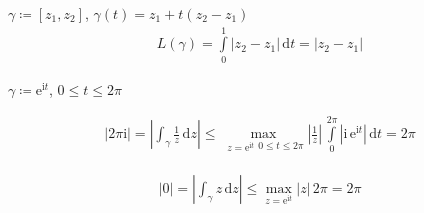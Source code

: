 \documentclass[a4paper,10pt]{scrbook}
\begin{document}
\begin{example}
  \begin{enum-arab}
    \item $\gamma \coloneq [z_1,z_2]$, $\gamma(t) = z_1 + t(z_2 - z_1)$
    \begin{align*}
      L(\gamma) = \int\limits_{0}^{1} |z_2 - z_1| \, \mathrm{d}t = |z_2 - z_1|
    \end{align*}

    \item $\gamma \coloneq \mathrm{e}^{\mathrm{i} t}$, $0 \leq t \leq 2 \pi$
    \begin{enum-alph}
      \item
      \begin{align*}
        |2 \pi \mathrm{i}| = \left| \int_\gamma \frac{1}{z} \, \mathrm{d}z \right| \leq \max\limits_{\substack{z = \mathrm{e}^{\mathrm{i} t}}{0 \leq t \leq 2 \pi}} \left| \frac{1}{z} \right| \, \int\limits_{0}^{2 \pi} \left| \mathrm{i} \,  \mathrm{e}^{\mathrm{i} t} \right| \, \mathrm{d}t = 2 \pi
      \end{align*}

      \item
      \begin{align*}
        |0| = \left| \int_\gamma z \, \mathrm{d}z \right| \leq \max\limits_{z = \mathrm{e}^{\mathrm{i} t}} |z| \, 2 \pi = 2 \pi
      \end{align*}
    \end{enum-alph}
  \end{enum-arab}
\end{example}
\end{document}
